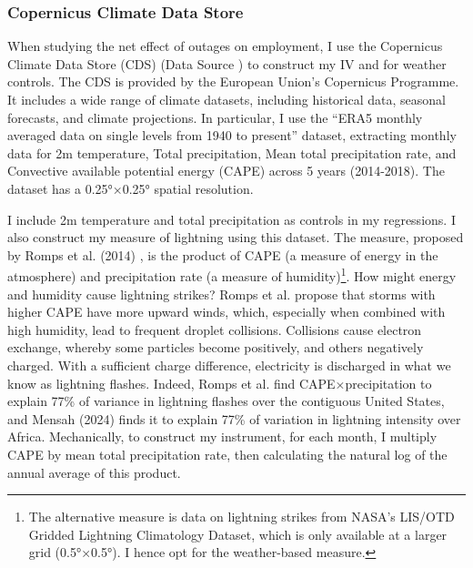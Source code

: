 \documentclass[12pt]{article}
\begin{document}
\subsubsection{Copernicus Climate Data Store}
When studying the net effect of outages on employment, I use the Copernicus Climate Data Store (CDS) (Data Source \cite{cds}) to construct my IV and for weather controls. The CDS is provided by the European Union’s Copernicus Programme. It includes a wide range of climate datasets, including historical data, seasonal forecasts, and climate projections. In particular, I use the “ERA5 monthly averaged data on single levels from 1940 to present” dataset, extracting monthly data for 2m temperature, Total precipitation, Mean total precipitation rate, and Convective available potential energy (CAPE) across 5 years (2014-2018). The dataset has a 0.25°×0.25° spatial resolution. 
\par
I include 2m temperature and total precipitation as controls in my regressions. I also construct my measure of lightning using this dataset. The measure, proposed by Romps et al. (2014) \cite{romps2014a}, is the product of CAPE (a measure of energy in the atmosphere) and precipitation rate (a measure of humidity)\footnote{The alternative measure is data on lightning strikes from NASA’s LIS/OTD Gridded Lightning Climatology Dataset, which is only available at a larger grid (0.5°×0.5°). I hence opt for the weather-based measure.}. How might energy and humidity cause lightning strikes? Romps et al. propose that storms with higher CAPE have more upward winds, which, especially when combined with high humidity, lead to frequent droplet collisions. Collisions cause electron exchange, whereby some particles become positively, and others negatively charged. With a sufficient charge difference, electricity is discharged in what we know as lightning flashes. Indeed, Romps et al. find CAPE×precipitation to explain 77\% of variance in lightning flashes over the contiguous United States, and Mensah (2024) \cite{mensah2024a} finds it to explain 77\% of variation in lightning intensity over Africa. Mechanically, to construct my instrument, for each month, I multiply CAPE by mean total precipitation rate, then calculating the natural log of the annual average of this product.
\end{document}

